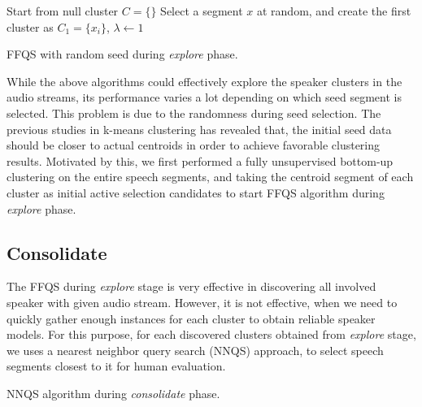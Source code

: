 \documentclass[journal]{IEEEtran}
\begin{document}
\begin{algorithm}
	Start from null cluster $C= \{\}$\;
	Select a segment $x$ at random, and create the first cluster as $C_1 = \{x_i\}$, $\lambda \leftarrow 1$\; 
	\caption{FFQS with random seed during \textit{explore} phase.}
\end{algorithm}
 
While the above algorithms could effectively explore the speaker clusters in the audio streams, its performance varies a lot depending on which seed segment is selected. This problem is due to the randomness during seed selection. The previous studies in k-means clustering has revealed that, the initial seed data should be closer to actual centroids in order to achieve favorable clustering results. Motivated by this, we first performed a fully unsupervised bottom-up clustering on the entire speech segments, and taking the centroid segment of each cluster as initial active selection candidates to start FFQS algorithm during \textit{explore} phase.

\subsection{Consolidate}
The FFQS during \textit{explore} stage is very effective in discovering all involved speaker with given audio stream. However, it is not effective, when we need to quickly gather enough instances for each cluster to obtain reliable speaker models. For this purpose, for each discovered clusters obtained from \textit{explore} stage, we uses a nearest neighbor query search (NNQS) approach, to select speech segments closest to it for human evaluation.  

\begin{algorithm}
	\caption{NNQS algorithm during \textit{consolidate} phase.}
\end{algorithm}
\end{document}

